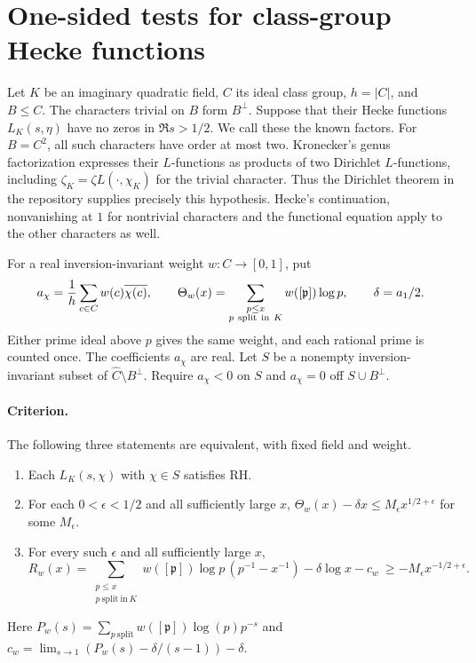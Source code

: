 \section{One-sided tests for class-group Hecke functions}
Let $K$ be an imaginary quadratic field, $C$ its ideal class group,
$h=|C|$, and $B\le C$. The characters trivial on $B$ form $B^\perp$.
Suppose that their Hecke functions $L_K(s,\eta)$ have no zeros in
$\Re s>1/2$. We call these the known factors. For $B=C^2$, all such
characters have order at most two. Kronecker's genus factorization expresses
their $L$-functions as products of two Dirichlet $L$-functions, including
$\zeta_K=\zeta L(\cdot,\chi_K)$ for the trivial character. Thus the
Dirichlet theorem in the repository supplies precisely this hypothesis.
Hecke's continuation, nonvanishing at $1$ for nontrivial characters and the
functional equation apply to the other characters as well.

For a real inversion-invariant weight $w:C\to[0,1]$, put
\[
 a_\chi={1\over h}\sum_{c\in C} w(c)\overline{\chi(c)},\qquad
 \Theta_w(x)=\sum_{\substack{p\le x\\p\ \mathrm{split\ in}\ K}}
     w([\mathfrak p])\log p,\qquad \delta=a_1/2 .
\]
Either prime ideal above $p$ gives the same weight, and each rational prime
is counted once. The coefficients $a_\chi$ are real.
Let $S$ be a nonempty inversion-invariant subset of
$\widehat C\setminus B^\perp$. Require $a_\chi<0$ on $S$ and
$a_\chi=0$ off $S\cup B^\perp$.

\paragraph{Criterion.}
The following three statements are equivalent, with fixed field and weight.
\begin{enumerate}
\item Each $L_K(s,\chi)$ with $\chi\in S$ satisfies RH.
\item For each $0<\epsilon<1/2$ and all sufficiently large $x$,
$\Theta_w(x)-\delta x\le M_\epsilon x^{1/2+\epsilon}$ for some $M_\epsilon$.
\item For every such $\epsilon$ and all sufficiently large $x$,
\[
 R_w(x)=\sum_{\substack{p\le x\\p\ \mathrm{split\ in}\ K}}
 w([\mathfrak p])\log p\,(p^{-1}-x^{-1})
       -\delta\log x-c_w \ \ge -M_\epsilon x^{-1/2+\epsilon}.
\]
\end{enumerate}
Here $P_w(s)=\sum_{p\ \mathrm{split}}w([\mathfrak p])\log(p)p^{-s}$ and
$c_w=\lim_{s\to1}(P_w(s)-\delta/(s-1))-\delta$.

